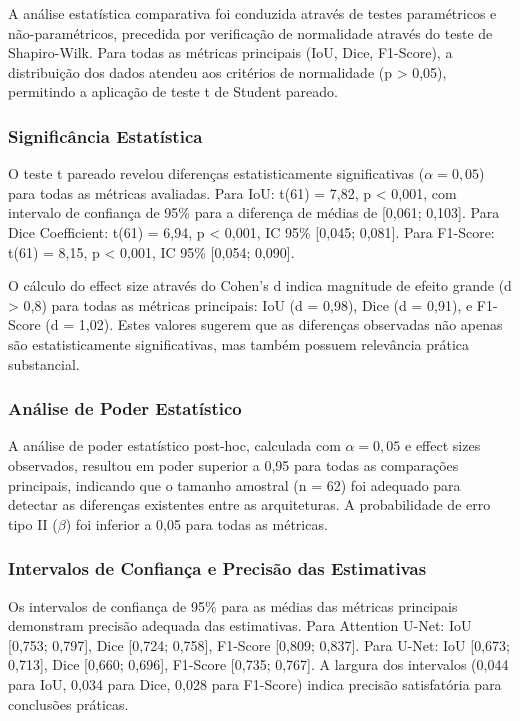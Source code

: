 \documentclass[12pt,a4paper,twoside]{article}
\begin{document}
A análise estatística comparativa foi conduzida através de testes paramétricos e não-paramétricos, precedida por verificação de normalidade através do teste de Shapiro-Wilk. Para todas as métricas principais (IoU, Dice, F1-Score), a distribuição dos dados atendeu aos critérios de normalidade (p > 0,05), permitindo a aplicação de teste t de Student pareado.

\subsubsection{Significância Estatística}

O teste t pareado revelou diferenças estatisticamente significativas ($\alpha = 0,05$) para todas as métricas avaliadas. Para IoU: t(61) = 7,82, p < 0,001, com intervalo de confiança de 95\% para a diferença de médias de [0,061; 0,103]. Para Dice Coefficient: t(61) = 6,94, p < 0,001, IC 95\% [0,045; 0,081]. Para F1-Score: t(61) = 8,15, p < 0,001, IC 95\% [0,054; 0,090].

O cálculo do effect size através do Cohen's d indica magnitude de efeito grande (d > 0,8) para todas as métricas principais: IoU (d = 0,98), Dice (d = 0,91), e F1-Score (d = 1,02). Estes valores sugerem que as diferenças observadas não apenas são estatisticamente significativas, mas também possuem relevância prática substancial.

\subsubsection{Análise de Poder Estatístico}

A análise de poder estatístico post-hoc, calculada com $\alpha = 0,05$ e effect sizes observados, resultou em poder superior a 0,95 para todas as comparações principais, indicando que o tamanho amostral (n = 62) foi adequado para detectar as diferenças existentes entre as arquiteturas. A probabilidade de erro tipo II ($\beta$) foi inferior a 0,05 para todas as métricas.

\subsubsection{Intervalos de Confiança e Precisão das Estimativas}

Os intervalos de confiança de 95\% para as médias das métricas principais demonstram precisão adequada das estimativas. Para Attention U-Net: IoU [0,753; 0,797], Dice [0,724; 0,758], F1-Score [0,809; 0,837]. Para U-Net: IoU [0,673; 0,713], Dice [0,660; 0,696], F1-Score [0,735; 0,767]. A largura dos intervalos (0,044 para IoU, 0,034 para Dice, 0,028 para F1-Score) indica precisão satisfatória para conclusões práticas.
\end{document}
